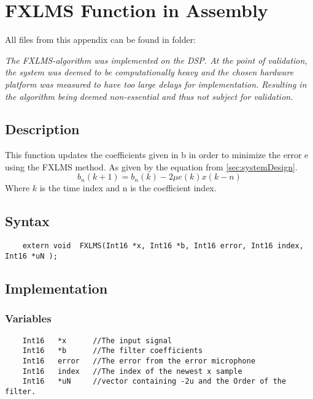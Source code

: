 
\section{FXLMS Function in Assembly}

All files from this appendix can be found in folder: \\

\textit{The FXLMS-algorithm was implemented on the DSP. At the point of validation, the system was deemed to be computationally heavy and the chosen hardware platform was measured to have too large delays for implementation. Resulting in the algorithm being deemed non-essential and thus not subject for validation.} 

\subsection{Description}
This function updates the coefficients given in b in order to minimize the error e using the FXLMS method. As given by the equation from \autoref{sec:systemDesign}.
\begin{equation}
	b_n(k+1)=b_n(k)-2\mu e(k)x(k-n)
\end{equation}
Where $k$ is the time index and n is the coefficient index.

\subsection{Syntax} 
\begin{lstlisting}
	extern void  FXLMS(Int16 *x, Int16 *b, Int16 error, Int16 index, Int16 *uN );
\end{lstlisting}

\subsection{Implementation}

\subsubsection{Variables}
\begin{lstlisting}
	Int16 	*x 		//The input signal
	Int16	*b		//The filter coefficients
	Int16	error	//The error from the error microphone
	Int16	index	//The index of the newest x sample
	Int16	*uN		//vector containing -2u and the Order of the filter.
\end{lstlisting}
\pagebreak
